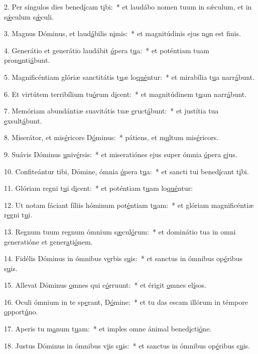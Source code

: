 2. Per síngulos dies bened\uline{í}cam t\uline{i}bi:~* et laudábo nomen tuum in sǽculum, et in s\uline{ǽ}culum s\uline{ǽ}culi.\par 
3. Magnus Dóminus, et laud\uline{á}bilis n\uline{i}mis:~* et magnitúdinis ejus n\uline{o}n est f\uline{i}nis.\par 
4. Generátio et generátio laudábit \uline{ó}pera t\uline{u}a:~* et poténtiam tuam pron\uline{u}nti\uline{á}bunt.\par 
5. Magnificéntiam glóriæ sanctitátis t\uline{u}æ lo\uline{qué}ntur:~* et mirabília t\uline{u}a narr\uline{á}bunt.\par 
6. Et virtútem terribílium tu\uline{ó}rum d\uline{i}cent:~* et magnitúdinem t\uline{u}am narr\uline{á}bunt.\par 
7. Memóriam abundántiæ suavitátis tuæ \uline{e}ruct\uline{á}bunt:~* et justítia tua \uline{e}xsult\uline{á}bunt.\par 
8. Miserátor, et mis\uline{é}ricors D\uline{ó}minus:~* pátiens, et m\uline{u}ltum mis\uline{é}ricors.\par 
9. Suávis Dóminus \uline{u}niv\uline{é}rsis:~* et miseratiónes ejus super ómnia \uline{ó}pera \uline{e}jus.\par 
10. Confiteántur tibi, Dómine, ómnia \uline{ó}pera t\uline{u}a:~* et sancti tui bened\uline{í}cant t\uline{i}bi.\par 
11. Glóriam regni t\uline{u}i d\uline{i}cent:~* et poténtiam t\uline{u}am lo\uline{qué}ntur:\par 
12. Ut notam fáciant fíliis hóminum pot\uline{é}ntiam t\uline{u}am:~* et glóriam magnificéntiæ r\uline{e}gni t\uline{u}i.\par 
13. Regnum tuum regnum ómnium s\uline{æ}cul\uline{ó}rum:~* et dominátio tua in omni generatióne et gener\uline{a}ti\uline{ó}nem.\par 
14. Fidélis Dóminus in ómnibus v\uline{e}rbis s\uline{u}is:~* et sanctus in ómnibus op\uline{é}ribus s\uline{u}is.\par 
15. Allevat Dóminus \uline{o}mnes qui c\uline{ó}rruunt:~* et érigit \uline{o}mnes el\uline{í}sos.\par 
16. Oculi ómnium in te sp\uline{e}rant, D\uline{ó}mine:~* et tu das escam illórum in témpore \uline{o}pport\uline{ú}no.\par 
17. Aperis tu m\uline{a}num t\uline{u}am:~* et imples omne ánimal bened\uline{i}cti\uline{ó}ne.\par 
18. Justus Dóminus in ómnibus v\uline{i}is s\uline{u}is:~* et sanctus in ómnibus op\uline{é}ribus s\uline{u}is.\par 
